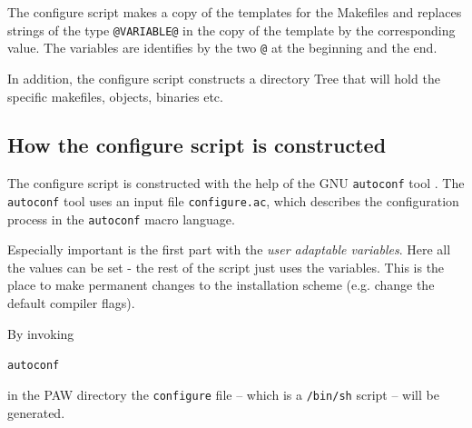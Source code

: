 \documentclass[a4paper,10pt]{report}
\newcommand{\mytt}[1]{{\tt #1}}
\begin{document}
The configure script makes a copy of the templates for the Makefiles
and replaces strings of the type \mytt{@VARIABLE@} in the copy of the
template by the corresponding value. The variables are identifies by
the two \mytt{@} at the beginning and the end.

In addition, the configure script constructs a directory Tree that will
hold the specific makefiles, objects, binaries etc.

\subsection{How the configure script is constructed}
\label{sec:constructconfigure}

The configure script is constructed with the help of the GNU
\mytt{autoconf} tool . The \mytt{autoconf} tool uses an input file
\mytt{configure.ac}, which describes the configuration process in the
\mytt{autoconf} macro language.

Especially important is the first part with the \emph{user adaptable
variables}. Here all the values can be set - the rest of the script just uses
the variables.  This is the place to make permanent changes to the installation
scheme (e.g. change the default compiler flags).

By invoking
\begin{center}
\mytt{autoconf}
\end{center}
in the PAW directory the \texttt{configure} file -- which is a
\texttt{/bin/sh} script -- will be generated.


\appendix
\newpage
\end{document}
